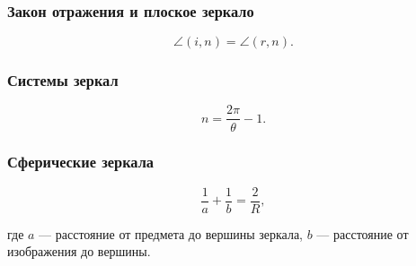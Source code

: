 \documentclass[12pt, a4paper]{article}
\begin{document}
\subsubsection*{Закон отражения и плоское зеркало}

\[
\angle(i,n)=\angle(r,n).
\]

\subsubsection*{Системы зеркал}

\[
n = \dfrac{2\pi}{\theta}-1.
\]

\subsubsection*{Сферические зеркала}

\[
\frac{1}{a}+\frac{1}{b}=\frac{2}{R},
\]

где $a$ — расстояние от предмета до вершины зеркала, $b$ — расстояние от изображения до вершины.
\end{document}
